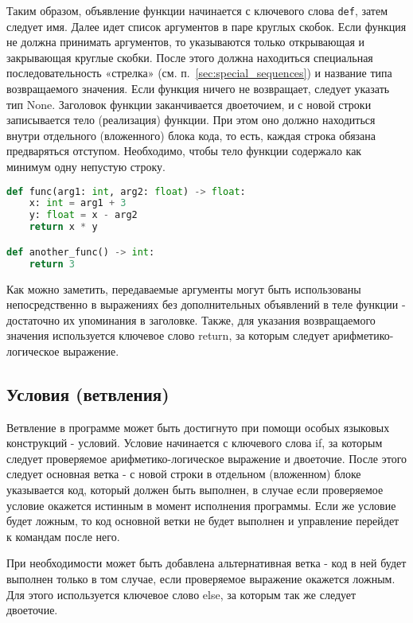 Таким образом, объявление функции начинается с ключевого слова \verb|def|, затем следует имя.
Далее идет список аргументов в паре круглых скобок.
Если функция не должна принимать аргументов, то указываются только открывающая и закрывающая круглые скобки.
После этого должна находиться специальная последовательность «стрелка» (см. п.~\ref{sec:special_sequences}) и название типа возвращаемого значения.
Если функция ничего не возвращает, следует указать тип None.
Заголовок функции заканчивается двоеточием, и с новой строки записывается тело (реализация) функции.
При этом оно должно находиться внутри отдельного (вложенного) блока кода, то есть, каждая строка обязана предваряться отступом.
Необходимо, чтобы тело функции содержало как минимум одну непустую строку.

\begin{lstlisting}[language=Python, caption=Примеры объявлений функций]
def func(arg1: int, arg2: float) -> float:
    x: int = arg1 + 3
    y: float = x - arg2
    return x * y

def another_func() -> int:
    return 3
\end{lstlisting}

Как можно заметить, передаваемые аргументы могут быть использованы непосредственно в выражениях без дополнительных объявлений в теле функции - достаточно их упоминания в заголовке.
Также, для указания возвращаемого значения используется ключевое слово return, за которым следует арифметико-логическое выражение.

\subsection{Условия (ветвления)}

Ветвление в программе может быть достигнуто при помощи особых языковых конструкций - условий.
Условие начинается с ключевого слова if, за которым следует проверяемое арифметико-логическое выражение и двоеточие.
После этого следует основная ветка - с новой строки в отдельном (вложенном) блоке указывается код, который должен быть выполнен, в случае если проверяемое условие окажется истинным в момент исполнения программы.
Если же условие будет ложным, то код основной ветки не будет выполнен и управление перейдет к командам после него.

При необходимости может быть добавлена альтернативная ветка - код в ней будет выполнен только в том случае, если проверяемое выражение окажется ложным.
Для этого используется ключевое слово else, за которым так же следует двоеточие.

